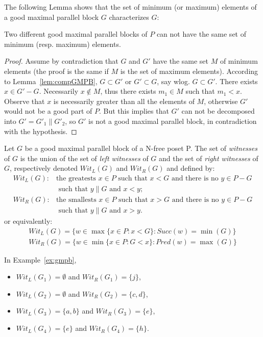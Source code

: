 \documentclass{CSML}
\begin{document}
The following Lemma shows that the set of minimum (or maximum) elements of a good maximal parallel block $G$ characterizes $G$:
\begin{lem}
  \label{lem:unicityGMPBMin}
  Two different good maximal parallel blocks of $P$ can not have the same set of minimum (resp. maximum) elements.
\end{lem}

\begin{proof}
  Assume by contradiction that $G$ and $G'$ have the same set $M$ of minimum elements (the proof is the same if $M$ is the set of maximum elements).
  According to Lemma~\ref{lem:compGMPB}, $G\subset G'$ or $G'\subset G$, say wlog. $G\subset G'$.
  There exists $x\in G'-G$.
  Necessarily $x\not\in M$, thus there exists $m_1\in M$ such that $m_1<x$. Observe that $x$ is necessarily greater than all the elements of $M$, otherwise $G'$ would not be a good part of $P$. But this implies that $G'$ can not be decomposed into $G'=G'_1\parallel G'_2$, so $G'$ is not a good maximal parallel block, in contradiction with the hypothesis.
\end{proof}

Let $G$ be a good maximal parallel block of a N-free poset P. The set of \emph{witnesses} of $G$ is the union of the set of \emph{left witnesses} of $G$ and the set of \emph{right witnesses} of $G$, respectively denoted $Wit_L(G)$ and $Wit_R(G)$ and defined by:
\begin{align*}
Wit_L(G) :& \text{the greatests }x\in P\text{ such that }x<G\text{ and there is no }y\in P-G\\&\text{ such that }y\parallel G\text{ and }x<y;\\
Wit_R(G) :& \text{the smallests }x\in P\text{ such that }x>G\text{ and there is no }y\in P-G\\&\text{ such that }y\parallel G\text{ and }x>y.
\end{align*}
or equivalently:
\begin{align*}
  Wit_L(G)=\{ w\in\max\{x\in P : x<G\} : Succ(w)=\min(G)\}\\
  Wit_R(G)=\{ w\in\min\{x\in P : G<x\} : Pred(w)=\max(G)\}
\end{align*}

\begin{exa}
  In Example~\ref{ex:gmpb},
  \begin{multicols}{2}
  \begin{itemize}
  \item $Wit_L(G_1)=\emptyset$ and $Wit_R(G_1)=\{j\}$,
  \item $Wit_L(G_2)=\emptyset$ and $Wit_R(G_2)=\{c,d\}$,
  \item $Wit_L(G_3)=\{a,b\}$ and $Wit_R(G_3)=\{e\}$,
  \item $Wit_L(G_4)=\{e\}$ and $Wit_R(G_4)=\{h\}$.
  \end{itemize}
  \end{multicols}
\end{exa}
\end{document}
